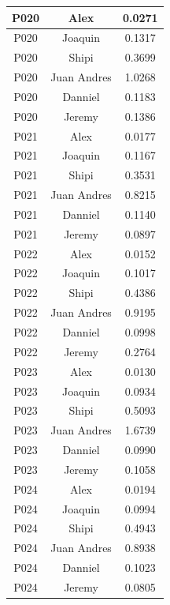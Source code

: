 \begin{longtable}{|c|c|c|}
    P020 & Alex        & 0.0271 \\ \hline
    P020 & Joaquin     & 0.1317 \\ \hline
    P020 & Shipi       & 0.3699 \\ \hline
    P020 & Juan Andres & 1.0268 \\ \hline
    P020 & Danniel     & 0.1183 \\ \hline
    P020 & Jeremy      & 0.1386 \\ \hline

    P021 & Alex        & 0.0177 \\ \hline
    P021 & Joaquin     & 0.1167  \\ \hline
    P021 & Shipi       & 0.3531 \\ \hline
    P021 & Juan Andres & 0.8215 \\ \hline
    P021 & Danniel     & 0.1140 \\ \hline
    P021 & Jeremy      & 0.0897 \\ \hline

    P022 & Alex        & 0.0152 \\ \hline
    P022 & Joaquin     & 0.1017 \\ \hline
    P022 & Shipi       & 0.4386 \\ \hline
    P022 & Juan Andres & 0.9195 \\ \hline
    P022 & Danniel     & 0.0998 \\ \hline
    P022 & Jeremy      & 0.2764 \\ \hline

    P023 & Alex        & 0.0130 \\ \hline
    P023 & Joaquin     & 0.0934  \\ \hline
    P023 & Shipi       & 0.5093 \\ \hline
    P023 & Juan Andres & 1.6739 \\ \hline
    P023 & Danniel     & 0.0990 \\ \hline
    P023 & Jeremy      & 0.1058 \\ \hline

    P024 & Alex        & 0.0194 \\ \hline
    P024 & Joaquin     & 0.0994 \\ \hline
    P024 & Shipi       & 0.4943 \\ \hline
    P024 & Juan Andres & 0.8938 \\ \hline
    P024 & Danniel     & 0.1023 \\ \hline
    P024 & Jeremy      & 0.0805 \\ \hline


\end{longtable}
